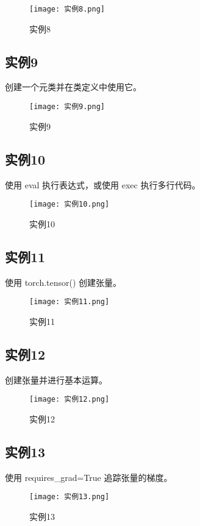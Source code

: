 \documentclass[a4paper, 12pt]{article}
\begin{document}
\begin{figure}[h!]
  \centering
  \texttt{[image: 实例8.png]}
  \caption{实例8}
\end{figure}

\subsection{实例9}
创建一个元类并在类定义中使用它。

\begin{figure}[h!]
  \centering
  \texttt{[image: 实例9.png]}
  \caption{实例9}
\end{figure}

\subsection{实例10}
使用 eval 执行表达式，或使用 exec 执行多行代码。

\begin{figure}[h!]
  \centering
  \texttt{[image: 实例10.png]}
  \caption{实例10}
\end{figure}

\subsection{实例11}
使用 torch.tensor() 创建张量。

\begin{figure}[h!]
  \centering
  \texttt{[image: 实例11.png]}
  \caption{实例11}
\end{figure}

\subsection{实例12}
创建张量并进行基本运算。

\begin{figure}[h!]
  \centering
  \texttt{[image: 实例12.png]}
  \caption{实例12}
\end{figure}

\subsection{实例13}
使用 requires\_grad=True 追踪张量的梯度。

\begin{figure}[h!]
  \centering
  \texttt{[image: 实例13.png]}
  \caption{实例13}
\end{figure}
\end{document}
